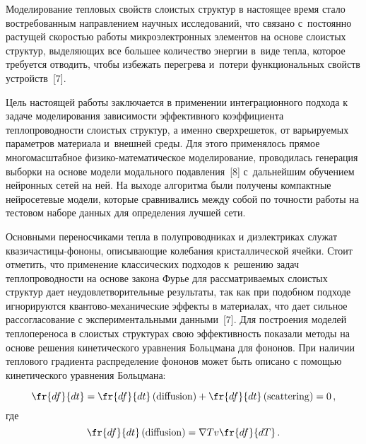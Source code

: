 \begin{multicols}{2}
\vspace*{-4pt}

    Моделирование тепловых свойств слоистых структур в настоящее время 
стало востребованным направлением научных исследований, что связано 
с~постоянно растущей скоростью работы микроэлектронных элементов на основе 
слоистых структур, выделяющих все большее количество энергии в~виде тепла, 
которое требуется отводить, \mbox{чтобы} избежать перегрева и~потери 
функциональных свойств устройств~[7].
     
    Цель настоящей работы заключается в применении интеграционного 
подхода к задаче моделирования зависимости эффективного коэффициента 
теплопроводности слоистых структур, а именно сверхрешеток, от варьируемых 
параметров материала и~внеш\-ней среды. Для этого применялось прямое 
многомасштабное 
 фи\-зи\-ко-ма\-те\-ма\-ти\-че\-ское моделирование, проводилась генерация 
выборки на основе модели модального подавления~[8] с~дальнейшим обучением 
нейронных сетей на ней. На выходе алгоритма были получены компактные 
нейросетевые модели, которые сравнивались между собой по точ\-ности работы 
на тестовом наборе данных для определения лучшей сети.
    
    Основными переносчиками тепла в полупроводниках и диэлектриках 
служат квази\-час\-ти\-цы-фо\-но\-ны, описывающие колебания кристаллической 
ячейки. Стоит отметить, что применение классических подходов к~решению 
задач теплопроводности на основе закона Фурье для рас\-смат\-ри\-ва\-емых слоистых 
структур дает неудовлетворительные результаты, так как  при подобном подходе 
игнорируются  
кван\-то\-во-ме\-ха\-ни\-че\-ские эффекты в материалах, что дает сильное 
рассогласование с экспериментальными данными~[7]. Для построения моделей 
теплопереноса в слоистых структурах свою эффективность показали методы на 
основе решения кинетического уравнения Больцмана для фононов. При наличии 
теплового градиента распределение фононов может быть описано с помощью 
кинетического уравнения Больцмана:

\noindent
    \begin{equation*}
    \fr{df}{dt}= 
\fr{df}{dt}\left(\mathrm{diffusion}\right)+\fr{df}{dt}\left(\mathrm{scattering}\right)=0\,,
\end{equation*}
где
$$
    \fr{df}{dt}\left( \mathrm{diffusion}\right)=\nabla T v \fr{df}{dT}\,.
  $$
    

\end{multicols}
